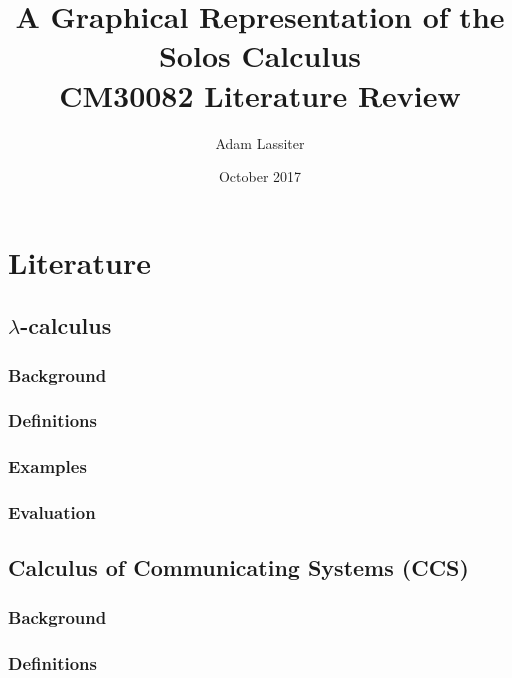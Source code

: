 \documentclass{article}
\title{A Graphical Representation of the Solos Calculus \\
	\large CM30082 Literature Review}
\author{Adam Lassiter}
\date{October 2017}
\begin{document}
\maketitle

\vfill

\tableofcontents

\pagebreak



\section{Literature}

    \subsection{$\lambda$-calculus}
        \subsubsection{Background}
            \cite{lambda-calculus}

        \subsubsection{Definitions}

        \subsubsection{Examples}

        \subsubsection{Evaluation}


    \subsection{Calculus of Communicating Systems (CCS)}
        \subsubsection{Background}
            \cite{pi-calculus-in-ccs}

        \subsubsection{Definitions}
\end{document}
